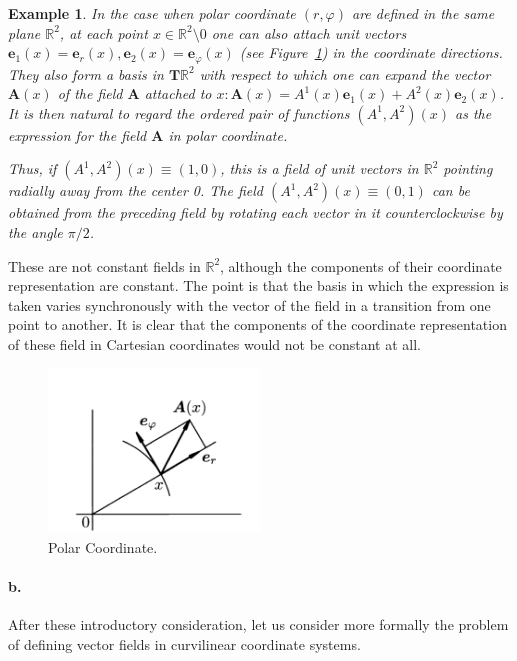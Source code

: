 \documentclass[a4paper,12pt]{article}
\newtheorem{example}{Example}             %
\begin{document}
\begin{CJK}{UTF8}{gbsn}
\begin{example}
    In the case when polar coordinate $\left(r, \varphi\right)$ are defined 
    in the same plane $\mathbb{R}^2$, at each point $x \in \mathbb{R}^2 
    \setminus 0$  one can also attach unit vectors $\bm{e}_1(x) = \bm{e}_r(x),
    \bm{e}_2(x) = \bm{e}_{\varphi}(x)$ (see Figure~\ref{fig:fig2})
    in the coordinate directions. They also form a basis in 
    $\bm{T}\mathbb{R}^2$ with respect to which one can expand the 
    vector $\bm{A}(x)$ of the field $\bm{A}$ attached to $x: 
    \bm{A}(x) = A^1(x)\bm{e}_1(x) + A^2(x)\bm{e}_2(x)$. It is then 
    natural to regard the ordered pair of functions $(A^1, A^2)(x)$
    as the expression for the field $\bm{A}$ in polar coordinate.

    Thus, if $(A^1, A^2)(x) \equiv (1, 0)$, this is a field of unit vectors 
    in $\mathbb{R}^2$ pointing radially away from the center 0.
    The field $\left(A^1, A^2\right)(x) \equiv \left(0,1\right)$ can be obtained from 
    the preceding field by rotating each vector in it counterclockwise 
    by the angle $\pi/2$.
\end{example}

These are not constant fields in $\mathbb{R}^2$, although the components 
of their coordinate representation are constant. The point is that 
the basis in which the expression is taken varies synchronously 
with the vector of the field in a transition from one point to another.
It is clear that the components of the coordinate representation of 
these field in Cartesian coordinates would not be constant at all.

\begin{figure}[htbp]
    \centering
    \includegraphics[width=0.5\textwidth]{vector_base2.png}
    \caption{Polar Coordinate.}
    \label{fig:fig2}
\end{figure}

\paragraph{\textbf{b.}} After these introductory consideration, let us
consider more formally the problem of defining vector fields in 
curvilinear coordinate systems.


\end{CJK}
\end{document}
